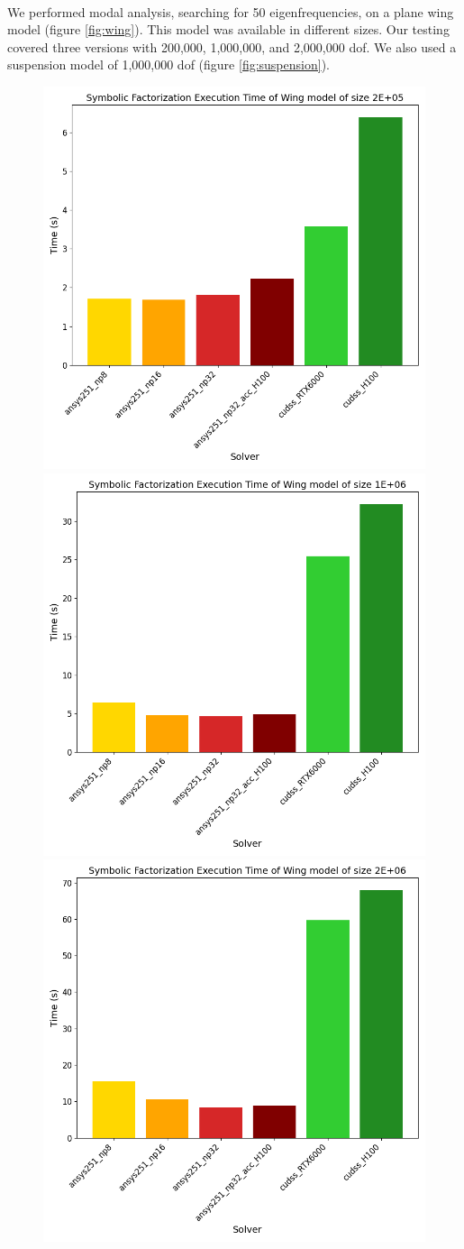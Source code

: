 \paragraph*{}
We performed modal analysis, searching for 50 eigenfrequencies, on a plane wing model (figure \ref{fig:wing}). This model was available in different sizes.  Our testing covered three versions with 200,000, 1,000,000, and 2,000,000 \acrlong{dof}. We also used a suspension model of 1,000,000 \acrlong{dof} (figure \ref{fig:suspension}).

\begin{figure}[H]
    \centering
    \includegraphics[width=0.49\linewidth]{results/cudss_bench/wing_symbolic_facto_2E5.png}
    \includegraphics[width=0.49\linewidth]{results/cudss_bench/wing_symbolic_facto_1E6.png}
    \includegraphics[width=0.49\linewidth]{results/cudss_bench/wing_symbolic_facto_2E6.png}

\end{figure}
